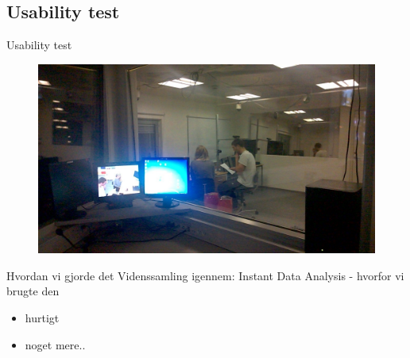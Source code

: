 \subsection{Usability test}
\begin{frame}{Usability test}
	\begin{figure}
		\centering
		\includegraphics{slides/Heider/subjectRoom}
	\end{figure}
	Hvordan vi gjorde det
	Videnssamling igennem: Instant Data Analysis - hvorfor vi brugte den
	\begin{itemize}
		\item hurtigt
		\item noget mere..
	\end{itemize}
\end{frame}